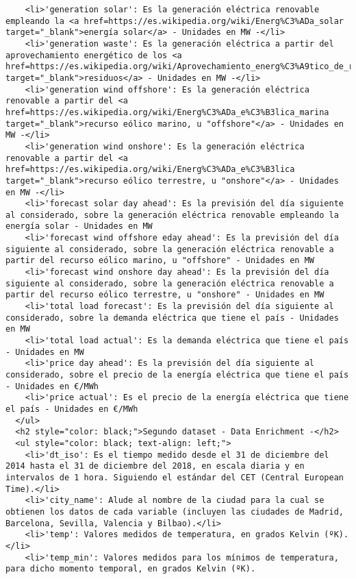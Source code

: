 \documentclass[11pt]{article}
\begin{document}
\begin{verbatim}
    <li>'generation solar': Es la generación eléctrica renovable empleando la <a href=https://es.wikipedia.org/wiki/Energ%C3%ADa_solar target="_blank">energía solar</a> - Unidades en MW -</li>
    <li>'generation waste': Es la generación eléctrica a partir del aprovechamiento energético de los <a href=https://es.wikipedia.org/wiki/Aprovechamiento_energ%C3%A9tico_de_residuos target="_blank">residuos</a> - Unidades en MW -</li>
    <li>'generation wind offshore': Es la generación eléctrica renovable a partir del <a href=https://es.wikipedia.org/wiki/Energ%C3%ADa_e%C3%B3lica_marina target="_blank">recurso eólico marino, u "offshore"</a> - Unidades en MW -</li>
    <li>'generation wind onshore': Es la generación eléctrica renovable a partir del <a href=https://es.wikipedia.org/wiki/Energ%C3%ADa_e%C3%B3lica target="_blank">recurso eólico terrestre, u "onshore"</a> - Unidades en MW -</li>
    <li>'forecast solar day ahead': Es la previsión del día siguiente al considerado, sobre la generación eléctrica renovable empleando la energía solar - Unidades en MW
    <li>'forecast wind offshore eday ahead': Es la previsión del día siguiente al considerado, sobre la generación eléctrica renovable a partir del recurso eólico marino, u "offshore" - Unidades en MW
    <li>'forecast wind onshore day ahead': Es la previsión del día siguiente al considerado, sobre la generación eléctrica renovable a partir del recurso eólico terrestre, u "onshore" - Unidades en MW
    <li>'total load forecast': Es la previsión del día siguiente al considerado, sobre la demanda eléctrica que tiene el país - Unidades en MW
    <li>'total load actual': Es la demanda eléctrica que tiene el país - Unidades en MW
    <li>'price day ahead': Es la previsión del día siguiente al considerado, sobre el precio de la energía eléctrica que tiene el país - Unidades en €/MWh
    <li>'price actual': Es el precio de la energía eléctrica que tiene el país - Unidades en €/MWh
  </ul>
  <h2 style="color: black;">Segundo dataset - Data Enrichment -</h2>
  <ul style="color: black; text-align: left;">
    <li>'dt_iso': Es el tiempo medido desde el 31 de diciembre del 2014 hasta el 31 de diciembre del 2018, en escala diaria y en intervalos de 1 hora. Siguiendo el estándar del CET (Central European Time).</li>
    <li>'city_name': Alude al nombre de la ciudad para la cual se obtienen los datos de cada variable (incluyen las ciudades de Madrid, Barcelona, Sevilla, Valencia y Bilbao).</li>
    <li>'temp': Valores medidos de temperatura, en grados Kelvin (ºK).</li>
    <li>'temp_min': Valores medidos para los mínimos de temperatura, para dicho momento temporal, en grados Kelvin (ºK).

\end{verbatim}
\end{document}
